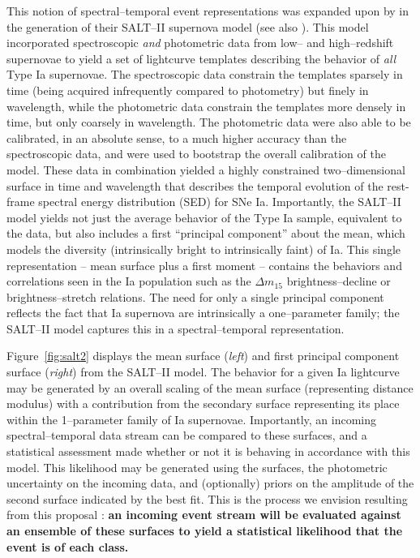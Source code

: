 This notion of spectral--temporal event representations was expanded upon  by
\cite{2007A&A...466...11G} in the generation of their SALT--II supernova model
(see also \cite{2007ApJ...663.1187H}).  This model incorporated spectroscopic
{\it and} photometric data from low-- and high--redshift supernovae to yield a
set of lightcurve templates describing the behavior of {\it all} Type Ia
supernovae. The spectroscopic data constrain the templates sparsely in time
(being acquired infrequently compared to photometry) but finely in wavelength,
while the photometric data constrain the templates more densely in time, but
only coarsely in wavelength.  The photometric data were also able to be
calibrated, in an absolute sense, to a much higher accuracy than the
spectroscopic data, and were used to bootstrap the overall calibration of the
model.  These data in combination yielded a highly constrained two--dimensional
surface in time and wavelength that describes the temporal evolution of the
rest-frame spectral energy distribution (SED) for SNe Ia. Importantly, the
SALT--II model yields not just the average behavior of the Type Ia sample,
equivalent to the \cite{2002PASP..114..803N} data, but also includes a first
``principal component'' about the mean, which models the diversity
(intrinsically bright to intrinsically faint) of Ia. This single representation
-- mean surface plus a first moment -- contains the behaviors and correlations
seen in the Ia population such as the $\Delta m_{15}$ brightness--decline
\citep{1993ApJ...413L.105P} or brightness--stretch \citep{1998AJ....116.1009R}
relations.  The need for only a single principal component reflects the fact
that Ia supernova are intrinsically a one--parameter family; the SALT--II model
captures this in a spectral--temporal representation.

Figure~\ref{fig:salt2} displays the mean surface ({\it left}) and first
principal component surface ({\it right}) from the SALT--II model.  The behavior
for a given Ia lightcurve may be generated by an overall scaling of the mean
surface (representing distance modulus) with a contribution from the secondary
surface representing its place within the 1--parameter family of Ia supernovae.
Importantly, an incoming spectral--temporal data stream can be compared to these
surfaces, and a statistical assessment made whether or not it is behaving in
accordance with this model.  This likelihood may be generated using the
surfaces, the photometric uncertainty on the incoming data, and (optionally)
priors on the amplitude of the second surface indicated by the best fit.  This
is the process we envision resulting from this proposal : {\bf an incoming event
stream will be evaluated against an ensemble of these surfaces to yield a
statistical likelihood that the event is of each class.}


